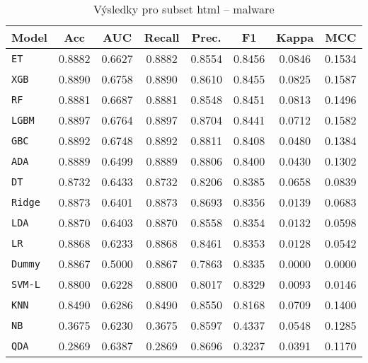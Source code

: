 \begin{table}[H]
  \centering
  \small
  \caption{Výsledky pro subset html – malware}
  \begin{tabular}{|l|c|c|c|c|c|c|c|}
    \hline
    \textbf{Model} & \textbf{Acc} & \textbf{AUC} & \textbf{Recall} & \textbf{Prec.} & \textbf{F1} & \textbf{Kappa} & \textbf{MCC} \\
    \hline
    \texttt{ET} & 0.8882 & 0.6627 & 0.8882 & 0.8554 & 0.8456 & 0.0846 & 0.1534 \\
    \texttt{XGB} & 0.8890 & 0.6758 & 0.8890 & 0.8610 & 0.8455 & 0.0825 & 0.1587 \\
    \texttt{RF} & 0.8881 & 0.6687 & 0.8881 & 0.8548 & 0.8451 & 0.0813 & 0.1496 \\
    \texttt{LGBM} & 0.8897 & 0.6764 & 0.8897 & 0.8704 & 0.8441 & 0.0712 & 0.1582 \\
    \texttt{GBC} & 0.8892 & 0.6748 & 0.8892 & 0.8811 & 0.8408 & 0.0480 & 0.1384 \\
    \texttt{ADA} & 0.8889 & 0.6499 & 0.8889 & 0.8806 & 0.8400 & 0.0430 & 0.1302 \\
    \texttt{DT} & 0.8732 & 0.6433 & 0.8732 & 0.8206 & 0.8385 & 0.0658 & 0.0839 \\
    \texttt{Ridge} & 0.8873 & 0.6401 & 0.8873 & 0.8693 & 0.8356 & 0.0139 & 0.0683 \\
    \texttt{LDA} & 0.8870 & 0.6403 & 0.8870 & 0.8558 & 0.8354 & 0.0132 & 0.0598 \\
    \texttt{LR} & 0.8868 & 0.6233 & 0.8868 & 0.8461 & 0.8353 & 0.0128 & 0.0542 \\
    \texttt{Dummy} & 0.8867 & 0.5000 & 0.8867 & 0.7863 & 0.8335 & 0.0000 & 0.0000 \\
    \texttt{SVM-L} & 0.8800 & 0.6228 & 0.8800 & 0.8017 & 0.8329 & 0.0093 & 0.0146 \\
    \texttt{KNN} & 0.8490 & 0.6286 & 0.8490 & 0.8550 & 0.8168 & 0.0709 & 0.1400 \\
    \texttt{NB} & 0.3675 & 0.6230 & 0.3675 & 0.8597 & 0.4337 & 0.0548 & 0.1285 \\
    \texttt{QDA} & 0.2869 & 0.6387 & 0.2869 & 0.8696 & 0.3237 & 0.0391 & 0.1170 \\
    \hline
  \end{tabular}
\end{table}
\vspace{0.5cm}

